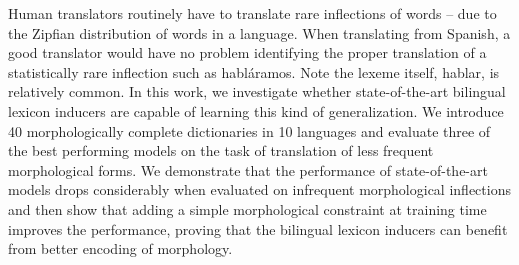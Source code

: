 Human translators routinely have to translate rare inflections of words -- due to the Zipfian distribution of words in a language. When translating from Spanish, a good translator would have no problem identifying the proper translation of a statistically rare inflection such as habláramos. Note the lexeme itself, hablar, is relatively common. In this work, we investigate whether state-of-the-art bilingual lexicon inducers are capable of learning this kind of generalization. We introduce 40 morphologically complete dictionaries in 10 languages and evaluate three of the best performing models on the task of translation of less frequent morphological forms. We demonstrate that the performance of state-of-the-art models drops considerably when evaluated on infrequent morphological inflections and then show that adding a simple morphological constraint at training time improves the performance, proving that the bilingual lexicon inducers can benefit from better encoding of morphology.